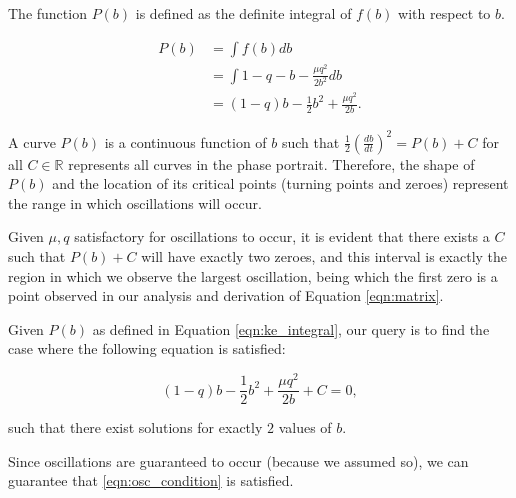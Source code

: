 \documentclass{article}
\begin{document}

The function $P(b)$ is defined as the definite integral of $f(b)$ with respect to $b$.

\begin{equation}
    \begin{aligned}
        P(b) &= \int f(b) db \\
        &= \int 1 - q - b - \frac{\mu q^2}{2 b^2} db \\
        &= (1-q)b - \frac{1}{2}b^2 + \frac{\mu q^2}{2b}.
    \end{aligned}
    \label{eqn:ke_integral}
\end{equation}

A curve $P(b)$ is a continuous function of $b$ such that $\frac{1}{2}\left(\frac{db}{dt}\right)^2 = P(b) +C$ for all $C \in \mathds{R}$
represents all curves in the phase portrait. Therefore, the shape of $P(b)$ and the location of its critical points (turning points and zeroes)
represent the range in which oscillations will occur.

Given $\mu, q$ satisfactory for oscillations to occur,
it is evident that there exists a $C$ such that $P(b)+C$ will have exactly two zeroes,
and this interval is exactly the region in which we observe the largest oscillation,
being which the first zero is a point observed in our analysis and derivation of Equation \ref{eqn:matrix}.

Given $P(b)$ as defined in Equation \ref{eqn:ke_integral},
our query is to find the case where the following equation is satisfied:

\begin{equation}
    (1-q)b - \frac{1}{2}b^2 + \frac{\mu q^2}{2b} + C = 0,
\end{equation}

such that there exist solutions for exactly $2$ values of $b$.

Since oscillations are guaranteed to occur (because we assumed so),
we can guarantee that \ref{eqn:osc_condition} is satisfied.





\end{document}
